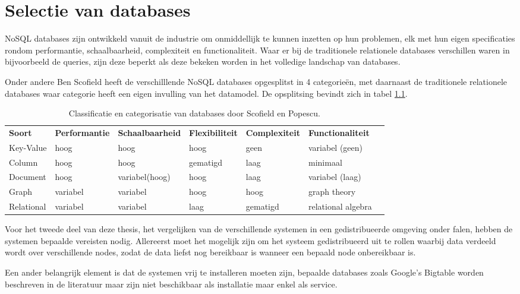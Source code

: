 \chapter{Selectie van databases}
NoSQL databases zijn ontwikkeld vanuit de industrie om onmiddellijk te kunnen inzetten op hun problemen, elk met hun eigen specificaties rondom performantie, schaalbaarheid, complexiteit en functionaliteit. Waar er bij de traditionele relationele databases verschillen waren in bijvoorbeeld de queries, zijn deze beperkt als deze bekeken worden in het volledige landschap van databases. 

Onder andere Ben Scofield heeft de verschilllende NoSQL databases opgesplitst in 4 categorieën, met daarnaast de traditionele relationele databases waar categorie heeft een eigen invulling van het datamodel. De opsplitsing bevindt zich in tabel \ref{table:selectie-classificatie}\cite{Strauch.NoSQL}.
\begin{table}[!h]
	\resizebox{\textwidth}{!} {
		\begin{tabular}{l l l l l l l}
			\textbf{Soort} & \textbf{Performantie} & \textbf{Schaalbaarheid} & 			\textbf{Flexibiliteit} & \textbf{Complexiteit} & \textbf{Functionaliteit} \\
			Key-Value & hoog & hoog & hoog & geen & variabel (geen) \\
			Column & hoog & hoog & gematigd & laag & minimaal \\
			Document & hoog & variabel(hoog) & hoog & laag & variabel (laag) \\
			Graph & variabel & variabel & hoog & hoog & graph theory \\
			Relational & variabel & variabel & laag & gematigd & relational algebra \\
		\end{tabular}
	}
	\label{table:selectie-classificatie}
	\caption{Classificatie en categorisatie van databases door Scofield en Popescu. \cite{categorizatie-sco10} \cite{categorizatie-pop10b} }
\end{table}

Voor het tweede deel van deze thesis, het vergelijken van de verschillende systemen in een gedistribueerde omgeving onder falen, hebben de systemen bepaalde vereisten nodig. Allereerst moet het mogelijk zijn om het systeem gedistribueerd uit te rollen waarbij data verdeeld wordt over verschillende nodes, zodat de data liefst nog bereikbaar is wanneer een bepaald node onbereikbaar is. 

Een ander belangrijk element is dat de systemen vrij te installeren moeten zijn, bepaalde databases zoals Google's Bigtable worden beschreven in de literatuur maar zijn niet beschikbaar als installatie maar enkel als service. 

